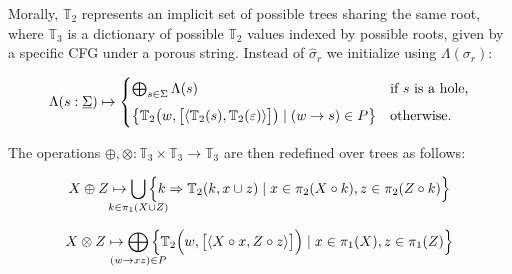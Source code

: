 \documentclass[portrait,a0b,final,a4resizeable]{a0poster}
\def\jointspacing{\vspace{0.3in}}
\begin{document}
\begin{poster}
\begin{multicols}{2}
      \vspace{1.5cm}

      \hspace*{2cm}\begin{minipage}[c]{0.90\columnwidth}
      Morally, $\mathbb{T}_2$ represents an implicit set of possible trees sharing the same root, where $\mathbb{T}_3$ is a dictionary of possible $\mathbb{T}_2$ values indexed by possible roots, given by a specific CFG under a porous string. Instead of $\hat\sigma_r$ we initialize using $\Lambda(\sigma_r)$:
      \end{minipage}

      \[
           \Lambda(s: \underline\Sigma) \mapsto \begin{cases}
               \bigoplus_{s\in \Sigma} \Lambda(s) & \text{if $s$ is a hole,} \vspace{5pt}\\
               \big\{\mathbb{T}_2\big(w, \big[\langle\mathbb{T}_2(s), \mathbb{T}_2(\varepsilon)\rangle\big]\big) \mid (w \rightarrow s)\in P\big\} & \text{otherwise.}
           \end{cases}
      \]
%
      \hspace*{2cm}\begin{minipage}[c]{0.90\columnwidth}
      The operations $\oplus, \otimes: \mathbb{T}_3 \times \mathbb{T}_3 \rightarrow \mathbb{T}_3$ are then redefined over trees as follows:
      \end{minipage}

      \[
          X \oplus Z \mapsto \bigcup_{\mathclap{k\in \pi_1(X \cup Z)}}\Big\{k \Rightarrow \mathbb{T}_2(k, x \cup z) \mid x \in \pi_2(X\circ k), z \in \pi_2(Z\circ k)\Big\}
      \]

      \[
        X \otimes Z \mapsto \bigoplus_{\mathclap{(w\rightarrow xz) \in P}}\Big\{\mathbb{T}_2\Big(w, \big[\langle X\circ x, Z\circ z\rangle\big]\Big) \mid x \in \pi_1(X), z \in \pi_1(Z)\Big\}
      \]
%

      \vspace{-0.5cm}
      \jointspacing


\end{multicols}
\end{poster}
\end{document}
